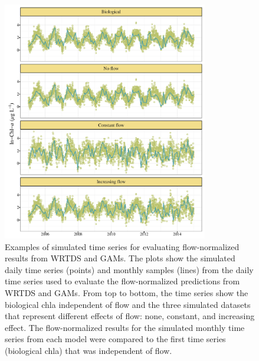 \documentclass{svjour3}\usepackage[]{graphicx}\usepackage[]{color}
\begin{document}
\begin{figure}
\centering
\includegraphics[width=0.8\textwidth]{figs/simex.pdf}
\caption{Examples of simulated time series for evaluating flow-normalized results from \ac{WRTDS} and \acp{GAM}.  The plots show the simulated daily time series (points) and monthly samples (lines) from the daily time series used to evaluate the flow-normalized predictions from \ac{WRTDS} and \acp{GAM}.  From top to bottom, the time series show the biological \ac{chla} independent of flow and the three simulated datasets that represent different effects of flow: none, constant, and increasing effect.  The flow-normalized results for the simulated monthly time series from each model were compared to the first time series (biological \ac{chla}) that was independent of flow.}
\end{figure}
\clearpage
\end{document}
